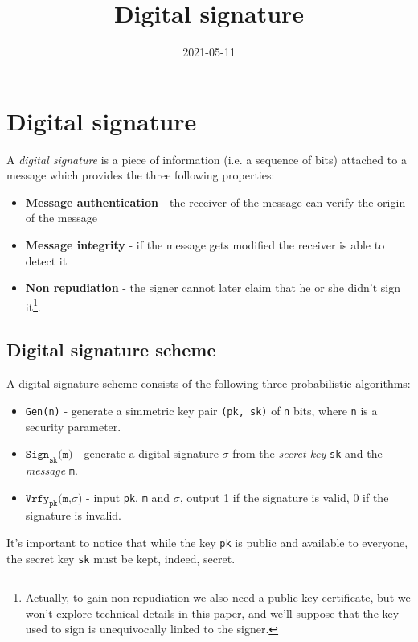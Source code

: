 \documentclass{article}
\title{Digital signature}
\author{}
\date{2021-05-11}
\begin{document}
	\maketitle

	\section{Digital signature}

	A \emph{digital signature} is a piece of information (i.e. a sequence of
	bits) attached to a message which provides the three following properties:
	\begin{itemize}
		\item \textbf{Message authentication} - the receiver of the message can
			verify the origin of the message
		\item \textbf{Message integrity} - if the message gets modified the
			receiver is able to detect it
		\item \textbf{Non repudiation} - the signer cannot later claim that he
			or she didn't sign it\footnote{Actually, to gain non-repudiation 
			we also need a public key certificate, but we won't explore 
			technical details in this paper, and we'll suppose that the key
			used to sign is unequivocally linked to the signer.}.
	\end{itemize}

	\subsection{Digital signature scheme}

	A digital signature scheme consists of the following three probabilistic
	algorithms:

	\begin{itemize}
		\item \texttt{Gen(n)} - generate a simmetric key pair \texttt{(pk, sk)}
			of \texttt{n} bits, where \texttt{n} is a security parameter.
		\item $\texttt{Sign}_{\texttt{sk}}\texttt{(m)}$ - generate a digital
			signature $\sigma$ from the \emph{secret key} \texttt{sk} and the
			\emph{message} \texttt{m}.
		\item $\texttt{Vrfy}_{\texttt{pk}}\texttt{(m,}\sigma\texttt{)}$ - input
			\texttt{pk}, \texttt{m} and $\sigma$, output
			1 if the signature is valid, 0 if the signature is invalid.
	\end{itemize}

	It's  important to notice that while the key \texttt{pk} is public and
	available to everyone, the secret key \texttt{sk} must be kept, indeed,
	secret.
\end{document}
